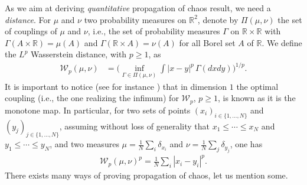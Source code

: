 \documentclass[11pt]{article}
\newcommand{\ie}{i.e.,\xspace}
\theoremstyle{plain}
\theoremstyle{definition}
\begin{document}
As we aim at deriving {\it quantitative} propagation of chaos result, we need a {\it distance}. For $\mu$ and $\nu$ two probability measures on $\mathbb{R}^{2}$, denote by $\Pi\left(\mu,\nu\right)$ the set of couplings of $\mu$ and $\nu$, \ie the
set of probability measures $\Gamma$ on $\mathbb{R}\times\mathbb{R}$ with $\Gamma(A\times \mathbb{R}) = \mu(A)$ and $\Gamma(\mathbb{R}\times
A ) = \nu(A)$ for all Borel set $A$ of $\mathbb{R}$. We define the $L^p$ Wasserstein distance, with $p\geq1$, as\vspace*{-3pt}
\begin{align*}
\mathcal{W}_{p}\left(\mu,\nu\right)&=\biggl(\inf_{\Gamma\in\Pi\left(\mu,\nu\right)}\int|x-y|^p\,\Gamma(dxdy)\biggr)^{1/p}.
\end{align*}
It is important to notice (see for instance \cite[Rem.\,3.28 \& 3.30]{cuturi_peyre}) that in dimension $1$ the optimal coupling (\ie the one realizing the infimum) for $\mathcal{W}_p$, $p\geq1$, is known as it is the monotone map. In particular, for two sets of points $(x_i)_{i\in\{1,\dots,N\}}$ and $(y_j)_{j\in\{1,\dots,N\}}$, assuming without loss of generality that ${x_1\leq\cdots\leq x_N}$ and \hbox{$y_1\leq\cdots\leq y_N$}, and two measures $\mu=\frac{1}{N}\sum_i\delta_{x_i}$ and ${\nu=\frac{1}{N}\sum_j\delta_{y_j}}$, one has
\begin{align*}
\mathcal{W}_{p}\left(\mu,\nu\right)^p=\frac{1}{N}\sum_i|x_i-y_i|^p.
\end{align*}
There exists many ways of proving propagation of chaos, let us mention some.
\end{document}
